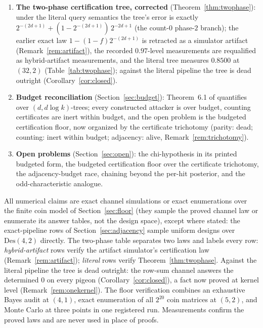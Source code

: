 \documentclass[11pt]{article}
\theoremstyle{definition}
\theoremstyle{remark}
\newcommand{\Des}{\mathrm{Des}}
\begin{document}
\begin{enumerate}
(Section~\ref{sec:adjacency}): two adjacent $1$s certify a free pair
\emph{with certainty} (Lemma~\ref{lem:adjacency}; a matched pair
forces its row-neighbors to the determined $0$), sound against the
literal pipeline directly, with no design property used.  The
scan-then-confirm chain measures success $0.9317$ at budget $1000$ at
both $(32,2)$ and $(64,4)$ ($0.9417$ on the exact pipeline at
$(32,2)$), posterior $1.0000$ on every certified output, certificate
rate $1-e^{-B/400}$: the per-query caps are sharp, but they are
per-query bounds, and the chain is the strongest known adaptive
attacker on the pipeline, with the scaling of its constant the
sharpest open problem (Open Problem~\ref{op:adjacency}).
\item \textbf{The two-phase certification tree, corrected}
(Theorem~\ref{thm:twophase}): under the literal query semantics the
tree's error is exactly
$2^{-(2d+1)}+(1-2^{-(2d+1)})\,2^{-2d+1}$ (the count-$0$ phase-$2$
branch); the earlier exact law $1-(1-f)2^{-(2d+1)}$ is retracted as a
simulator artifact (Remark~\ref{rem:artifact}), the recorded
$0.97$-level measurements are requalified as hybrid-artifact
measurements, and the literal tree measures $0.8500$ at $(32,2)$
(Table~\ref{tab:twophase}); against the literal pipeline the tree is
dead outright (Corollary~\ref{cor:closed}).
\item \textbf{Budget reconciliation} (Section~\ref{sec:budget}):
Theorem~6.1 of \cite{Kra26} quantifies over $(d,d\log k)$-trees; every
constructed attacker is over budget, counting certificates are inert
within budget, and the open problem is the budgeted certification
floor, now organized by the certificate trichotomy (parity: dead;
counting: inert within budget; adjacency: alive,
Remark~\ref{rem:trichotomy}).
\item \textbf{Open problems} (Section~\ref{sec:open}): the
chi-hypothesis in its printed budgeted form, the budgeted
certification floor over the certificate trichotomy, the
adjacency-budget race, chaining beyond the per-hit posterior,
and the odd-characteristic analogue.
\end{enumerate}

All numerical claims are exact channel simulations or exact
enumerations over the finite coin model of Section~\ref{sec:floor}
(they sample the proved channel law or enumerate its answer tables,
not the design space), except where stated: the exact-pipeline rows of
Section~\ref{sec:adjacency} sample uniform designs over $\Des(4,2)$
directly.  The two-phase table separates two laws and
labels every row: \emph{hybrid-artifact} rows verify the artifact
simulator's certification law (Remark~\ref{rem:artifact}); \emph{literal}
rows verify Theorem~\ref{thm:twophase}.  Against the literal pipeline
the tree is dead outright: the row-sum channel answers the determined
$0$ on every pigeon (Corollary~\ref{cor:closed}), a fact now proved at
kernel level (Remark~\ref{rem:onekernel}).  The floor verification
combines an exhaustive Bayes audit at $(4,1)$, exact enumeration of
all $2^{20}$ coin matrices at $(5,2)$, and Monte Carlo at three points
in one registered run.  Measurements confirm the proved laws and are
never used in place of proofs.
\end{document}

